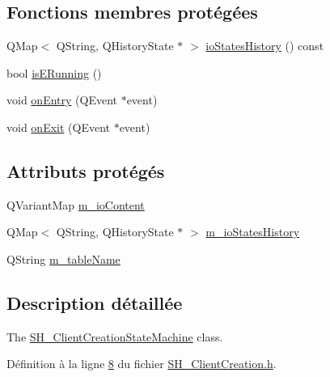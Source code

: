 \subsection*{Fonctions membres protégées}
\begin{DoxyCompactItemize}
\item 
Q\-Map$<$ Q\-String, Q\-History\-State $\ast$ $>$ \hyperlink{classSH__InOutStateMachine_a13889998c6dcd17db984dd6ed1454e80}{io\-States\-History} () const 
\item 
bool \hyperlink{classSH__InOutStateMachine_ae6c7448fbe267b035017108a9ffdff2e}{is\-E\-Running} ()
\item 
void \hyperlink{classSH__GenericStateMachine_adfd82f2532595ed7c4bcf21f03cbb951}{on\-Entry} (Q\-Event $\ast$event)
\item 
void \hyperlink{classSH__GenericStateMachine_a4b36d60fa1876908493d3d07f191a30f}{on\-Exit} (Q\-Event $\ast$event)
\end{DoxyCompactItemize}
\subsection*{Attributs protégés}
\begin{DoxyCompactItemize}
\item 
Q\-Variant\-Map \hyperlink{classSH__InOutStateMachine_a8cfbc27eef057bf37b7711bdfef2077e}{m\-\_\-io\-Content}
\item 
Q\-Map$<$ Q\-String, Q\-History\-State $\ast$ $>$ \hyperlink{classSH__InOutStateMachine_ac46ad1af230e1b2156d805275690dec3}{m\-\_\-io\-States\-History}
\item 
Q\-String \hyperlink{classSH__InOutStateMachine_aa009eecc5ab6181358faafb5996b6006}{m\-\_\-table\-Name}
\end{DoxyCompactItemize}


\subsection{Description détaillée}
The \hyperlink{classSH__ClientCreationStateMachine}{S\-H\-\_\-\-Client\-Creation\-State\-Machine} class. 

Définition à la ligne \hyperlink{SH__ClientCreation_8h_source_l00008}{8} du fichier \hyperlink{SH__ClientCreation_8h_source}{S\-H\-\_\-\-Client\-Creation.\-h}.



